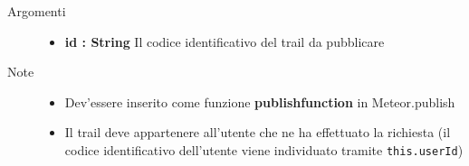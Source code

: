 \begin{description}
\begin{description}
		\begin{description}
			\item[Argomenti] \hfill
				\begin{itemize}
				
					\item \textbf{id : String			} \hfill
					Il codice identificativo del trail da pubblicare
					
				\end{itemize}
			\item[Note] \hfill
			\begin{itemize}
					\item Dev'essere inserito come funzione \textbf{publishfunction} in Meteor.publish
					\item Il trail deve appartenere all'utente che ne ha effettuato la richiesta (il codice identificativo dell'utente viene individuato tramite \texttt{this.userId})
				\end{itemize}
		\end{description}
	\end{description}
	
	
	
	
\end{description}




















